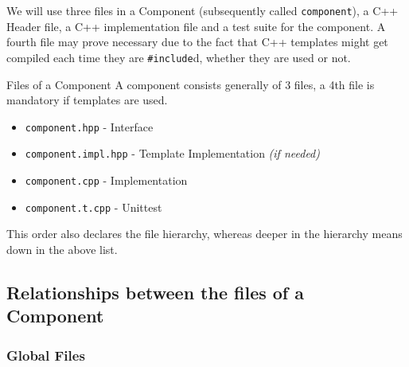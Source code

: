 We will use three files in a Component (subsequently called
\texttt{component}), a C++ Header file, a C++ implementation file and a test
suite for the component.
%
A fourth file may prove necessary due to the fact that C++ templates might get
compiled each time they are \texttt{\#include}d, whether they are used or not.

\begin{rule*}{Files of a Component}
  \label{rule:files-component}
  A component consists generally of 3 files, a 4th file is mandatory if
  templates are used.
  
  \begin{itemize}
    \item {\texttt{component.hpp} - Interface}
    \item {\texttt{component.impl.hpp} - Template Implementation \textit{(if needed)}}
    \item {\texttt{component.cpp} - Implementation}
    \item {\texttt{component.t.cpp} - Unittest}
  \end{itemize}
  This order also declares the file hierarchy, whereas deeper in the hierarchy
  means down in the above list.
\end{rule*}
%
\subsection{Relationships between the files of a Component }
\label{sec:relat-betw-files}

\subsubsection{Global Files}
\label{sec:global-files}

